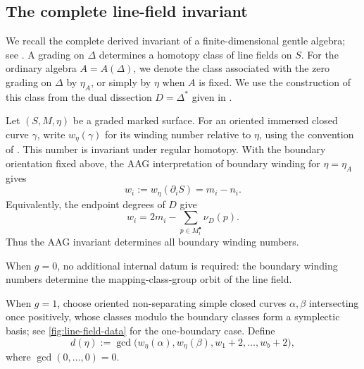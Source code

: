 \documentclass[11pt]{amsart}
\theoremstyle{definition}
\theoremstyle{plain}
\theoremstyle{definition}
\theoremstyle{definition}
\begin{document}
\subsection{The complete line-field invariant}

We recall the complete derived invariant of a finite-dimensional
gentle algebra; see
\cite{LekiliPolishchuk,AmiotPlamondonSchroll}.
A grading on $\Delta$ determines a homotopy class of line fields
on $S$.  For the ordinary algebra $A=A(\Delta)$, we denote the
class associated with the zero grading on $\Delta$ by $\eta_A$,
or simply by $\eta$ when $A$ is fixed.  We use the construction
of this class from the dual dissection $D=\Delta^*$ given in
\cite{AmiotPlamondonSchroll}.

Let $(S,M,\eta)$ be a graded marked surface.
For an oriented immersed closed curve $\gamma$, write
$w_\eta(\gamma)$ for its winding number relative to $\eta$,
using the convention of
\cite[Definition~3.2]{AmiotPlamondonSchroll}.
This number is invariant under regular homotopy.
With the boundary orientation fixed above, the AAG interpretation
of boundary winding for $\eta=\eta_A$ gives
\begin{equation}
\label{eq:boundary-winding}
 w_i:=w_{\eta}(\partial_iS)=m_i-n_i.
\end{equation}
Equivalently, the endpoint degrees of $D$ give
\[
 w_i=2m_i-\sum_{p\in M_i^\bullet}\nu_D(p).
\]
Thus the AAG invariant determines all boundary winding numbers.

When $g=0$, no additional internal datum is required: the boundary winding
numbers determine the mapping-class-group orbit of the line field.

When $g=1$, choose oriented non-separating simple closed curves
$\alpha,\beta$ intersecting once positively, whose classes modulo the
boundary classes form a symplectic basis; see
\cref{fig:line-field-data} for the one-boundary case.  Define
\begin{equation}
\label{eq:genus-one-gcd}
 d(\eta):=
 \gcd\bigl(
   w_\eta(\alpha),w_\eta(\beta),
   w_1+2,\ldots,w_b+2
 \bigr),
\end{equation}
where $\gcd(0,\ldots,0)=0$.
\end{document}
